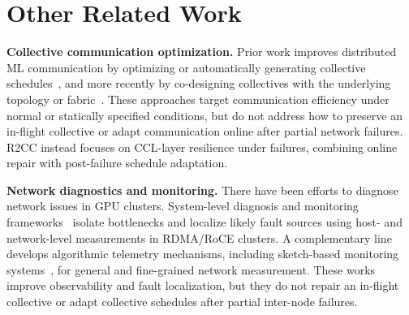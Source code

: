 \section{Other Related Work}

\smallskip\noindent\textbf{Collective communication optimization.} Prior work improves distributed ML communication by optimizing or automatically generating collective schedules~\cite{shah2023taccl,liu2024rethinking,devraj2025efficient}, and more recently by co-designing collectives with the underlying topology or fabric~\cite{kumar2025pccl}. These approaches target communication efficiency under normal or statically specified conditions, but do not address how to preserve an in-flight collective or adapt communication online after partial network failures. R2CC instead focuses on CCL-layer resilience under failures, combining online repair with post-failure schedule adaptation.

\smallskip\noindent\textbf{Network diagnostics and monitoring.}
There have been efforts to diagnose network issues in GPU clusters. System-level diagnosis and monitoring frameworks~\cite{liu2023hostping,liu2024hostmesh,liu2024r} isolate bottlenecks and localize likely fault sources using host- and network-level measurements in RDMA/RoCE clusters. A complementary line develops algorithmic telemetry mechanisms, including sketch-based monitoring systems~\cite{liu2016one, zhang2024octosketch}, for general and fine-grained network measurement. These works improve observability and fault localization, but they do not repair an in-flight collective or adapt collective schedules after partial inter-node failures.
